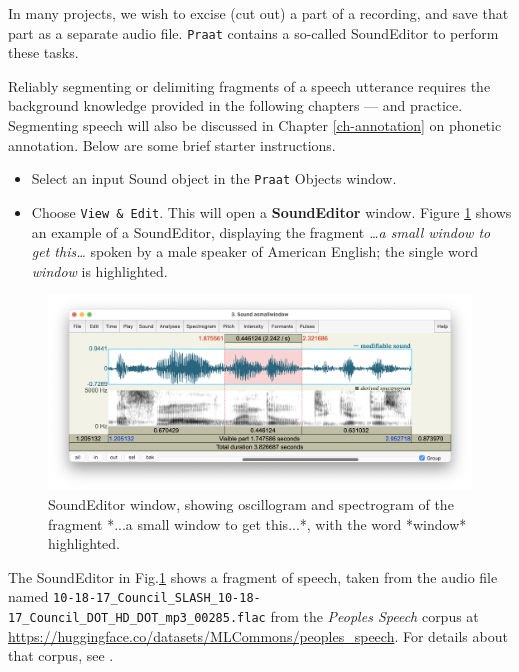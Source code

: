 \documentclass[
]{book}
\begin{document}
In many projects, we wish to excise (cut out) a part of a recording, and save that part as a separate audio file.
\texttt{Praat} contains a so-called SoundEditor to perform these tasks.

\label{box-segmenting}
Reliably segmenting or delimiting fragments of a speech utterance requires the background knowledge provided in the following chapters --- and practice. Segmenting speech will also be discussed in Chapter \ref{ch-annotation} on phonetic annotation. Below are some brief starter instructions.

\label{box-soundeditor}
\begin{itemize}
\item
  Select an input Sound object in the \texttt{Praat} Objects window.
\item
  Choose \texttt{View\ \&\ Edit}.
  This will open a \textbf{SoundEditor} window.
  Figure \ref{fig:window-soundeditor} shows an example of a SoundEditor, displaying the fragment \emph{\ldots a small window to get this\ldots{}} spoken by a male speaker of American English; the single word \emph{window} is highlighted.
\end{itemize}

\begin{figure}

{\centering \includegraphics{figures/asmallwindowtogetthis_SoundEditor2050124} 

}

\caption{SoundEditor window, showing oscillogram and spectrogram of the fragment *...a small window to get this...*, with the word *window* highlighted.}\label{fig:window-soundeditor}
\end{figure}

\label{box-windowsfile-details}
The SoundEditor in Fig.\ref{fig:window-soundeditor} shows a fragment of speech, taken from the audio file named \texttt{10-18-17\_Council\_SLASH\_10-18-17\_Council\_DOT\_HD\_DOT\_mp3\_00285.flac} from the \emph{Peoples Speech} corpus at \url{https://huggingface.co/datasets/MLCommons/peoples_speech}. For details about that corpus, see \citet{Galvez_Diamos_Ciro_Cerón_Achorn_Gopi_Kanter_Lam_Mazumder_Reddi_2021}.
\end{document}
